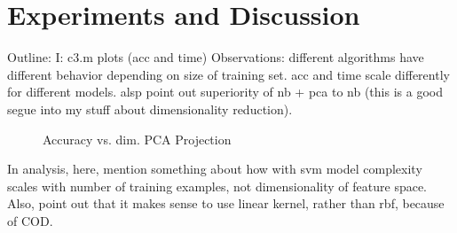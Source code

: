 \documentclass[]{article}
\begin{document}
\section{Experiments and Discussion}
Outline: 
I: c3.m plots (acc and time)
Observations: different algorithms have different behavior depending on size of training set. acc and time scale differently for different models.
alsp point out superiority of nb + pca to nb (this is a good segue into my stuff about dimensionality reduction).



\begin{figure}[h!]
\centering
{}
\caption{Accuracy vs. dim. PCA Projection}
\label{fig:pca_acc_vs_proj_dim}
\end{figure}

In analysis, here, mention something about how with svm model complexity scales with number of training examples, not dimensionality of feature space. Also, point out that it makes sense to use linear kernel, rather than rbf, because of COD. 
\end{document}
